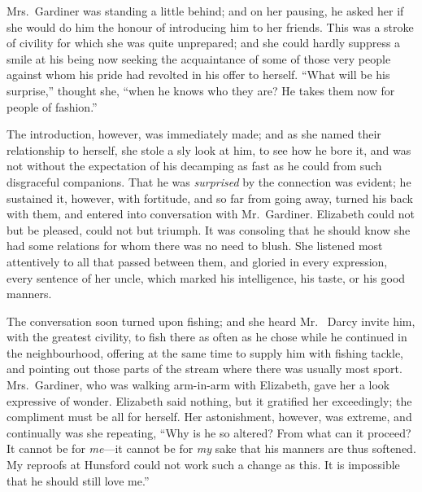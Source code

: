 Mrs.\ Gardiner was standing a little behind; and on her pausing,
he asked her if she would do him the honour of introducing him
to her friends.  This was a stroke of civility for which she
was quite unprepared; and she could hardly suppress a smile at
his being now seeking the acquaintance of some of those very
people against whom his pride had revolted in his offer to
herself.  ``What will be his surprise,'' thought she, ``when he
knows who they are?  He takes them now for people of fashion.''

The introduction, however, was immediately made; and as she
named their relationship to herself, she stole a sly look at
him, to see how he bore it, and was not without the expectation
of his decamping as fast as he could from such disgraceful
companions.  That he was \emph{surprised} by the connection was
evident; he sustained it, however, with fortitude, and so far
from going away, turned his back with them, and entered into
conversation with Mr.\ Gardiner.  Elizabeth could not but be
pleased, could not but triumph.  It was consoling that he should
know she had some relations for whom there was no need to
blush.  She listened most attentively to all that passed between
them, and gloried in every expression, every sentence of her
uncle, which marked his intelligence, his taste, or his good
manners.

The conversation soon turned upon fishing; and she heard Mr.\ %
Darcy invite him, with the greatest civility, to fish there as often
as he chose while he continued in the neighbourhood, offering
at the same time to supply him with fishing tackle, and pointing
out those parts of the stream where there was usually most
sport.  Mrs.\ Gardiner, who was walking arm-in-arm with
Elizabeth, gave her a look expressive of wonder.  Elizabeth
said nothing, but it gratified her exceedingly; the compliment
must be all for herself.  Her astonishment, however, was
extreme, and continually was she repeating, ``Why is he so
altered?  From what can it proceed?  It cannot be for \emph{me}---it
cannot be for \emph{my} sake that his manners are thus softened.  My
reproofs at Hunsford could not work such a change as this.
It is impossible that he should still love me.''

